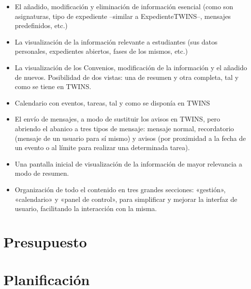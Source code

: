 \begin{itemize}
	\item El añadido, modificación y eliminación de información esencial (como son asignaturas, tipo de expediente --similar a \gls{ExpedienteTWINS}--, mensajes predefinidos, etc.)
	\item La visualización de la información relevante a estudiantes (sus datos personales, expedientes abiertos, fases de los mismos, etc.)
	\item La visualización de los \glspl{Convenio}, modificación de la información y el añadido de nuevos. Posibilidad de dos vistas: una de resumen y otra completa, tal y como se tiene en TWINS.
	\item Calendario con eventos, tareas, tal y como se disponía en TWINS
	\item El envío de mensajes, a modo de sustituir los avisos en TWINS, pero abriendo el abanico a tres tipos de mensaje: mensaje normal, recordatorio (mensaje de un usuario para sí mismo) y avisos (por proximidad a la fecha de un evento o al límite para realizar una determinada tarea).
	\item Una pantalla inicial de visualización de la información de mayor relevancia a modo de resumen. 
	\item Organización de todo el contenido en tres grandes secciones: «gestión», «calendario» y «panel de control», para simplificar y mejorar la interfaz de usuario, facilitando la interacción con la misma.
\end{itemize}

\section{Presupuesto}

\section{Planificación}
